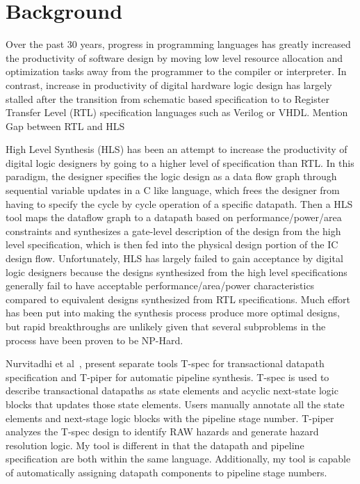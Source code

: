 \section{Background}
Over the past 30 years, progress in programming languages has greatly increased the productivity of software design by moving low level resource allocation and optimization tasks away from the programmer to the compiler or interpreter.  In contrast, increase in productivity of digital hardware logic design has largely stalled after the transition from schematic based specification to to Register Transfer Level (RTL) specification languages such as Verilog or VHDL. Mention Gap between RTL and HLS

High Level Synthesis (HLS) has been an attempt to increase the productivity of digital logic designers by going to a higher level of specification than RTL. In this paradigm, the designer specifies the logic design as a data flow graph through sequential variable updates in a C like language, which frees the designer from having to specify the cycle by cycle operation of a specific datapath. Then a HLS tool maps the dataflow graph to a datapath based on performance/power/area constraints and synthesizes a gate-level description of the design from the high level specification, which is then fed into the physical design portion of the IC design flow. Unfortunately, HLS has largely failed to gain acceptance by digital logic designers because the designs synthesized from the high level specifications generally fail to have acceptable performance/area/power characteristics compared to equivalent designs synthesized from RTL specifications. Much effort has been put into making the synthesis process produce more optimal designs, but rapid breakthroughs are unlikely given that several subproblems in the process have been proven to be NP-Hard\cite{McFarlan:1990}.

Nurvitadhi et al~\cite{hoe:syn}, \cite{hoe:mult} present separate tools T-spec for transactional datapath specification and T-piper for automatic pipeline synthesis. T-spec is used to describe transactional datapaths as state elements and acyclic next-state logic blocks that updates those state elements. Users manually annotate all the state elements and next-stage logic blocks with the pipeline stage number. T-piper analyzes the T-spec design to identify RAW hazards and generate hazard resolution logic. My tool is different in that the datapath and pipeline specification are both within the same language. Additionally, my tool is capable of automatically assigning datapath components to pipeline stage numbers.
